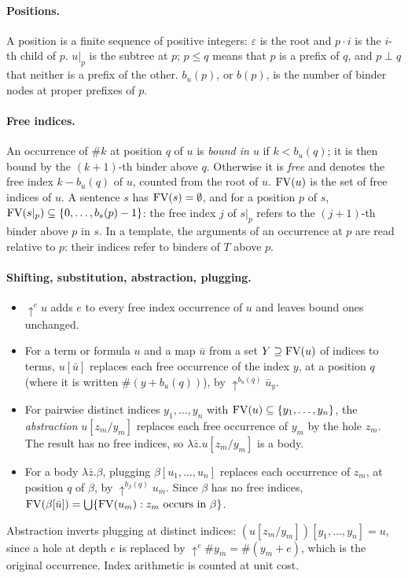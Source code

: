 \paragraph{Positions.}
A position is a finite sequence of positive integers: $\varepsilon$ is the root and $p\cdot i$ is the $i$-th child of $p$. $u|_p$ is the subtree at $p$; $p\le q$ means that $p$ is a prefix of $q$, and $p\perp q$ that neither is a prefix of the other. $b_u(p)$, or $b(p)$, is the number of binder nodes at proper prefixes of $p$.

\paragraph{Free indices.}
An occurrence of $\#k$ at position $q$ of $u$ is \emph{bound in $u$} if $k<b_u(q)$; it is then bound by the $(k{+}1)$-th binder above $q$. Otherwise it is \emph{free} and denotes the free index $k-b_u(q)$ of $u$, counted from the root of $u$. $\mathrm{FV}(u)$ is the set of free indices of $u$. A sentence $s$ has $\mathrm{FV}(s)=\emptyset$, and for a position $p$ of $s$, $\mathrm{FV}(s|_p)\subseteq\{0,\dots,b_s(p)-1\}$: the free index $j$ of $s|_p$ refers to the $(j{+}1)$-th binder above $p$ in $s$. In a template, the arguments of an occurrence at $p$ are read relative to $p$: their indices refer to binders of $T$ above $p$.

\paragraph{Shifting, substitution, abstraction, plugging.}
\begin{itemize}
\item $\uparrow^e u$ adds $e$ to every free index occurrence of $u$ and leaves bound ones unchanged.
\item For a term or formula $u$ and a map $\bar u$ from a set $Y\supseteq\mathrm{FV}(u)$ of indices to terms, $u[\bar u]$ replaces each free occurrence of the index $y$, at a position $q$ (where it is written $\#(y+b_u(q))$), by $\uparrow^{b_u(q)}\bar u_y$.
\item For pairwise distinct indices $y_1,\dots,y_n$ with $\mathrm{FV}(u)\subseteq\{y_1,\dots,y_n\}$, the \emph{abstraction} $u[z_m/y_m]$ replaces each free occurrence of $y_m$ by the hole $z_m$. The result has no free indices, so $\lambda\bar z.u[z_m/y_m]$ is a body.
\item For a body $\lambda\bar z.\beta$, plugging $\beta[u_1,\dots,u_n]$ replaces each occurrence of $z_m$, at position $q$ of $\beta$, by $\uparrow^{b_\beta(q)}u_m$. Since $\beta$ has no free indices, $\mathrm{FV}(\beta[\bar u])=\bigcup\{\mathrm{FV}(u_m): z_m\text{ occurs in }\beta\}$.
\end{itemize}
Abstraction inverts plugging at distinct indices: $(u[z_m/y_m])[y_1,\dots,y_n]=u$, since a hole at depth $e$ is replaced by $\uparrow^e\#y_m=\#(y_m+e)$, which is the original occurrence. Index arithmetic is counted at unit cost.

